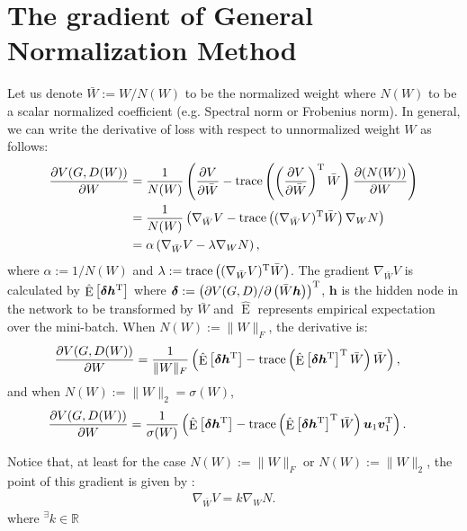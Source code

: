 \documentclass{article}
\newcommand{\bbR}{\mathbb{R}}
\newcommand{\bmu}{{\bm u}}
\newcommand{\bmv}{{\bm v}}
\newcommand{\bmh}{{\bm h}}
\newcommand{\bmdelta}{{\bm \delta}}
\newcommand{\E}{\mathop{\mathrm{E}}}
\begin{document}
\section{The gradient of General Normalization Method}
Let us denote $\bar{W}:=W/N(W)$ to be the normalized weight where $N(W)$ to be a scalar normalized coefficient (e.g. Spectral norm or Frobenius norm).
In general, we can write the derivative of loss with respect to unnormalized weight $W$ as follows:
\begin{align}
	\frac{\partial V(G,D(W))}{\partial W} &= \frac{1}{N(W)}\left(\frac{\partial V}{\partial \bar{W}} - {\rm trace}\left( \left(\frac{\partial V}{\partial \bar{W}}\right)^{\rm T} \bar{W}\right) \frac{\partial (N(W))}{\partial W}\right) \\
     &=\frac{1}{N(W)} \left(\nabla_{\bar{W}}V - {\rm trace}\left((\nabla_{\bar{W}}V) ^{\rm T} \bar{W}\right) \nabla_W N\right) \\
     & = \alpha \left(\nabla_{\bar{W}}V - \lambda \nabla_W N\right),
\end{align}
where $\alpha:=1/N(W)$ and $\lambda:={\rm trace}\left((\nabla_{\bar{W}}V) ^{\rm T} \bar{W}\right)$.
The gradient $\nabla_{\bar{W}}V$ is calculated by $\hat{\E}\left[\bmdelta \bmh^{\rm T}\right]$ where  $\bmdelta := \left(\partial V(G,D) / \partial \left(\bar{W} \bmh\right)\right)^{\rm T}$, $\bmh$ is the hidden node in the network to be transformed by $\bar{W}$ and $\hat{\E}$ represents empirical expectation over the mini-batch.
When $N(W):=\|W\|_F$, the derivative is:
\begin{align}
  \frac{\partial V(G,D(W))}{\partial W} &= \frac{1}{\|W\|_F}\left(\hat{\E}\left[\bmdelta \bmh^{\rm T}\right] - {\rm trace}\left(\hat{\E}\left[\bmdelta \bmh^{\rm T}\right]^{\rm T} \bar{W}\right)\bar{W}\right),
\end{align}
and when $N(W):=\|W\|_2 = \sigma(W)$,
\begin{align}
  \frac{\partial V(G,D(W))}{\partial W} &= \frac{1}{\sigma(W)}\left(\hat{\E}\left[\bmdelta \bmh^{\rm T}\right] - {\rm trace}\left(\hat{\E}\left[\bmdelta \bmh^{\rm T}\right]^{\rm T} \bar{W}\right) \bmu_1 \bmv_1^{\rm T}\right).
\end{align}

Notice that, at least for the case $N(W):=\|W\|_{F}$ or $N(W):=\|W\|_{2}$, the point of this gradient is given by :
\begin{align}
	\nabla_{\bar{W}}V = k \nabla_{W}N.
\end{align}
where $^\exists k\in \bbR$
\end{document}
